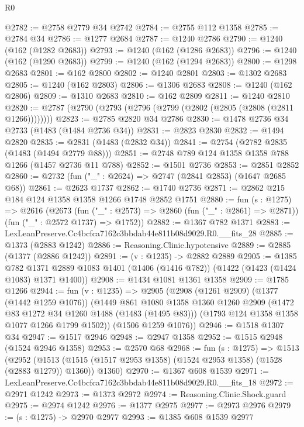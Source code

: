 \begin{lexlean}{R0}
\begin{coremodule}
@2782 := @2758 @2779 @34 @2742
@2784 := @2755 @112 @1358
@2785 := @2784 @34
@2786 := @1277 @2684
@2787 := @1240 @2786
@2790 := @1240 (@162 (@1282 @2683))
@2793 := @1240 (@162 (@1286 @2683))
@2796 := @1240 (@162 (@1290 @2683))
@2799 := @1240 (@162 (@1294 @2683))
@2800 := @1298 @2683
@2801 := @162 @2800
@2802 := @1240 @2801
@2803 := @1302 @2683
@2805 := @1240 (@162 @2803)
@2806 := @1306 @2683
@2808 := @1240 (@162 @2806)
@2809 := @1310 @2683
@2810 := @162 @2809
@2811 := @1240 @2810
@2820 := @2787 (@2790 (@2793 (@2796 (@2799 (@2802 (@2805 (@2808 (@2811 @1266))))))))
@2823 := @2785 @2820 @34 @2786
@2830 := @1478 @2736 @34 @2733 (@1483 (@1484 @2736 @34))
@2831 := @2823 @2830
@2832 := @1494 @2820
@2835 := @2831 (@1483 (@2832 @34))
@2841 := @2754 (@2782 @2835 (@1483 (@1494 @2779 @88)))
@2851 := @2748 @789 @124 @1358 @1358 @788 @1266 (@1457 @2736 @11 @788)
@2852 := @1501 @2736
@2853 := @2851 @2852
@2860 := @2732 (fun ("_" : @2624) => @2747 (@2841 @2853) (@1647 @2685 @68))
@2861 := @2623 @1737
@2862 := @1740 @2736
@2871 := @2862 @215 @184 @124 @1358 @1358 @1266 @1748 @2852 @1751
@2880 := fun (s : @1275) =>
  @2616
    (@2673
      (fun ("_" : @2573) => @2860 (fun ("_" : @2861) => @2871))
      (fun ("_" : @2572 @1737) => @1752))
@2882 := @1367 @782 @1371
@2883 := LexLeanPreserve.Cc4bcfca7162c3bbdab44e811b08d9029.R0.__fits_28
@2885 := @1373 (@2883 @1242)
@2886 := Reasoning.Clinic.hypotensive
@2889 := @2885 (@1377 (@2886 @1242))
@2891 := (v : @1235) -> @2882 @2889
@2905 := @1385
    @782
    @1371
    @2889
    @1083
    @1401
    (@1406 (@1416 @782))
    (@1422 (@1423 (@1424 @1083) @1371 @1400))
@2908 := @1434 @1081 @1361 @1358
@2909 := @1785 @1266
@2944 := fun (v : @1235) =>
  @2905
    (@2908
      (@1261 @2909)
      (@1377 (@1442 @1259 @1076))
      (@1449
        @861
        @1080
        @1358
        @1360
        @1260
        @2909
        (@1472 @83 @1272 @34 @1260 @1488 (@1483 (@1495 @83)))
        (@1793 @124 @1358 @1358 @1077 @1266 @1799 @1502))
      (@1506 @1259 @1076))
@2946 := @1518 @1307 @34
@2947 := @1517 @2946
@2948 := @2947 @1358
@2952 := @1515 @2948 (@1524 @2946 @1358)
@2953 := @2570 @68
@2968 := fun (s : @1275) =>
  @1513
    (@2952
      (@1513 (@1515 (@1517 @2953 @1358) (@1524 @2953 @1358) (@1528 (@2883 @1279)) @1360))
      @1360)
@2970 := @1367 @608 @1539
@2971 := LexLeanPreserve.Cc4bcfca7162c3bbdab44e811b08d9029.R0.__fits_18
@2972 := @2971 @1242
@2973 := @1373 @2972
@2974 := Reasoning.Clinic.Shock.guard
@2975 := @2974 @1242
@2976 := @1377 @2975
@2977 := @2973 @2976
@2979 := (s : @1275) -> @2970 @2977
@2993 := @1385
    @608
    @1539
    @2977

\end{coremodule}
\end{lexlean}
